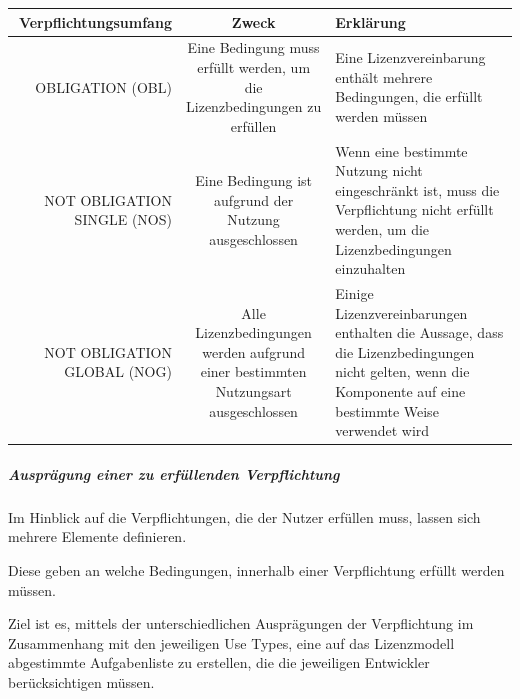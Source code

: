 \begin{tabular}[h]{|r|c|l|}
    \hline\hline
    Verpflichtungsumfang & Zweck & Erklärung \\
    \hline\hline
    \parbox{4cm}{OBLIGATION (OBL)} & \parbox{5cm}{Eine Bedingung muss erfüllt werden, um die Lizenzbedingungen zu erfüllen} & \parbox{5cm}{Eine Lizenzvereinbarung enthält mehrere Bedingungen, die erfüllt werden müssen} \\
    \hline
    \parbox{4cm}{NOT OBLIGATION SINGLE (NOS)} & \parbox{5cm}{Eine Bedingung ist aufgrund der Nutzung ausgeschlossen} & \parbox{5cm}{Wenn eine bestimmte Nutzung nicht eingeschränkt ist, muss die Verpflichtung nicht erfüllt werden, um die Lizenzbedingungen einzuhalten} \\
    \hline
    \parbox{4cm}{NOT OBLIGATION GLOBAL (NOG)} & \parbox{5cm}{Alle Lizenzbedingungen werden aufgrund einer bestimmten Nutzungsart ausgeschlossen} & \parbox{5cm}{Einige Lizenzvereinbarungen enthalten die Aussage, dass die Lizenzbedingungen nicht gelten, wenn die Komponente auf eine bestimmte Weise verwendet wird} \\

    \hline
\end{tabular}

\subparagraph{Ausprägung einer zu erfüllenden Verpflichtung}

Im Hinblick auf die Verpflichtungen, die der Nutzer erfüllen muss, lassen sich mehrere Elemente definieren. 

Diese geben an welche Bedingungen, innerhalb einer Verpflichtung erfüllt werden müssen. 

Ziel ist es, mittels der unterschiedlichen Ausprägungen der Verpflichtung im Zusammenhang mit den jeweiligen Use Types, eine auf das Lizenzmodell abgestimmte Aufgabenliste zu erstellen, die die jeweiligen Entwickler berücksichtigen müssen. \\

